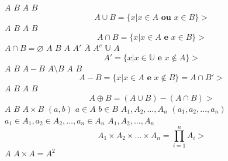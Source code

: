 \documentclass{article}
\begin{document}
$A$
$B$
$A$
$B$
$$
  A \cup B = \{x | x \in A \textbf{ ou } x \in B\}
>$$
$A$
$B$
$A$
$B$
$$
  A \cap B = \{x | x \in A \textbf{ e } x \in B\}
>$$
$A \cap B = \varnothing$
$A$
$B$
$A$
$A'$
$\bar{A}$
$A^c$
$\mathbb{U}$
$A$
$$
  A' = \{x | x \in \mathbb{U} \textbf{ e } x \not \in A\}
>$$
$A$
$B$
$A-B$
$A \setminus B$
$A$
$B$
$$
  A - B = \{x | x \in A \textbf{ e } x \not \in B\} = A \cap B'
>$$
$A$
$B$
$A$
$B$
$$
  A \oplus B = (A \cup B) - (A \cap B)
>$$
$A$
$B$
$A \times B$
$(a, b)$
$a \in A$
$b \in B$
$A_1, A_2, \dots, A_n$
$(a_1, a_2, \dots, a_n)$
$a_1 \in A_1, a_2 \in A_2, \dots, a_n \in A_n$
$A_1, A_2, \dots, A_n$
$$
  A_1 \times A_2 \times \dots \times A_n = \prod_{i=1}^{n}{A_i}
>$$
$A$
$A \times A = A^2$
\end{document}
